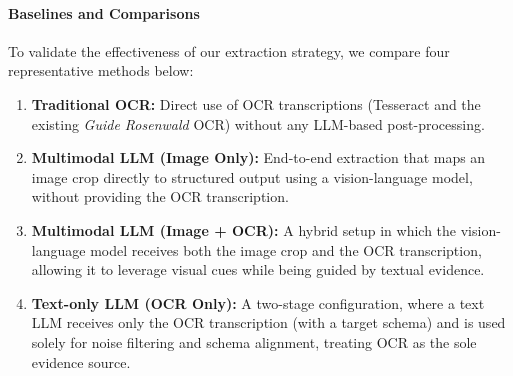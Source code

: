 \paragraph{Baselines and Comparisons}
To validate the effectiveness of our extraction strategy, we compare four representative methods below:

\begin{enumerate}
    \item \textbf{Traditional OCR:} Direct use of OCR transcriptions (Tesseract and the existing \textit{Guide Rosenwald} OCR) without any LLM-based post-processing.
    \item \textbf{Multimodal LLM (Image Only):} End-to-end extraction that maps an image crop directly to structured output using a vision-language model, without providing the OCR transcription.
    \item \textbf{Multimodal LLM (Image + OCR):} A hybrid setup in which the vision-language model receives both the image crop and the OCR transcription, allowing it to leverage visual cues while being guided by textual evidence.
    \item \textbf{Text-only LLM (OCR Only):} A two-stage configuration, where a text LLM receives only the OCR transcription (with a target schema) and is used solely for noise filtering and schema alignment, treating OCR as the sole evidence source.
\end{enumerate}


